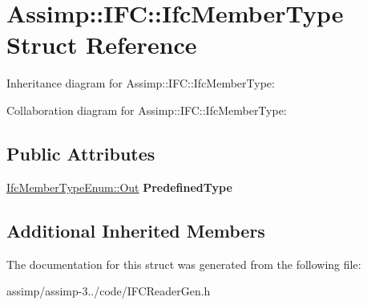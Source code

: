 \hypertarget{struct_assimp_1_1_i_f_c_1_1_ifc_member_type}{\section{Assimp\+:\+:I\+F\+C\+:\+:Ifc\+Member\+Type Struct Reference}
\label{struct_assimp_1_1_i_f_c_1_1_ifc_member_type}
}


Inheritance diagram for Assimp\+:\+:I\+F\+C\+:\+:Ifc\+Member\+Type\+:


Collaboration diagram for Assimp\+:\+:I\+F\+C\+:\+:Ifc\+Member\+Type\+:
\subsection*{Public Attributes}
\begin{DoxyCompactItemize}
\item 
\hypertarget{struct_assimp_1_1_i_f_c_1_1_ifc_member_type_a1b0b1c4abd19ffe901ee1836c3cd6c1c}{\hyperlink{classboost_1_1shared__ptr}{Ifc\+Member\+Type\+Enum\+::\+Out} {\bfseries Predefined\+Type}}\label{struct_assimp_1_1_i_f_c_1_1_ifc_member_type_a1b0b1c4abd19ffe901ee1836c3cd6c1c}

\end{DoxyCompactItemize}
\subsection*{Additional Inherited Members}


The documentation for this struct was generated from the following file\+:\begin{DoxyCompactItemize}
\item 
assimp/assimp-\/3../code/I\+F\+C\+Reader\+Gen.\+h\end{DoxyCompactItemize}
